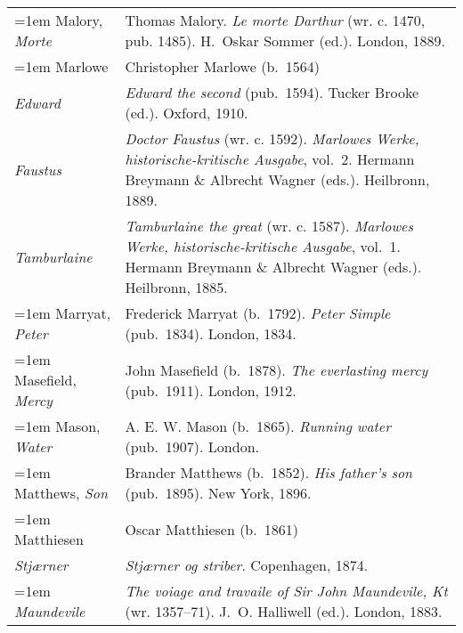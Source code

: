 \begin{xltabular}{\textwidth}{ lQ }
\hangindent=1em  Malory, \textit{Morte} & Thomas Malory. \textit{Le morte Darthur} (wr. c. 1470, pub. 1485). H.~Oskar Sommer (ed.). London, 1889. \\

\hangindent=1em  Marlowe & Christopher Marlowe (b.~1564) \\
\hspace{1em}\textit{Edward} & \textit{Edward the second} (pub.~1594). Tucker Brooke (ed.). Oxford, 1910. \\
\hspace{1em}\textit{Faustus} & \textit{Doctor Faustus} (wr. c. 1592). \textit{Marlowes Werke, historische-kritische Ausgabe}, vol.~2. Hermann Breymann \& Albrecht Wagner (eds.). Heilbronn, 1889. \\
\hspace{1em}\textit{Tambur\-laine} & \textit{Tamburlaine the great} (wr. c. 1587). \textit{Marlowes Werke, historische-kritische Ausgabe}, vol.~1. Hermann Breymann \& Albrecht Wagner (eds.). Heilbronn, 1885. \\

\hangindent=1em  Marryat, \textit{Peter} & Frederick Marryat (b.~1792). \textit{Peter Simple} (pub.~1834). London, 1834. \\

\hangindent=1em  Masefield, \textit{Mercy} & John Masefield (b.~1878). \textit{The everlasting mercy} (pub.~1911). London, 1912. \\

\hangindent=1em  Mason, \textit{Water} & A. E. W. Mason (b.~1865). \textit{Running water} (pub.~1907). London. \\

\hangindent=1em  Matthews, \textit{Son} & Brander Matthews (b.~1852). \textit{His father's son} (pub.~1895). New York, 1896. \\

\hangindent=1em  Matthiesen  & Oscar Matthiesen (b.~1861)\\
\hspace{1em}\textit{Stjærner} & \textit{Stjærner og striber}. Copenhagen, 1874. \\ %

\hangindent=1em  \textit{Maundevile} & \textit{The voiage and travaile of Sir John Maundevile, Kt} (wr. 1357--71). J.~O. Halliwell (ed.). London, 1883. \\


\end{xltabular}

